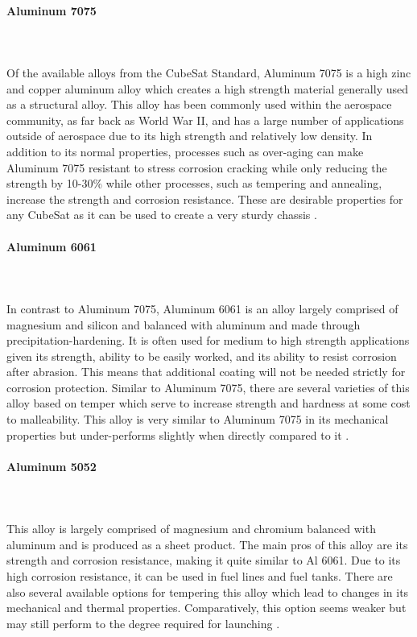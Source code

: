 \paragraph{Aluminum 7075} ~\\~\\
Of the available alloys from the CubeSat Standard, Aluminum 7075 is a high zinc and copper aluminum alloy which creates a high strength material generally used as a structural alloy. This alloy has been commonly used within the aerospace community, as far back as World War II, and has a large number of applications outside of aerospace due to its high strength and relatively low density. In addition to its normal properties, processes such as over-aging can make Aluminum 7075 resistant to stress corrosion cracking while only reducing the strength by 10-30\% while other processes, such as tempering and annealing, increase the strength and corrosion resistance. These are desirable properties for any CubeSat as it can be used to create a very sturdy chassis \cite{ASM}. 
\paragraph{Aluminum 6061} ~\\~\\
In contrast to Aluminum 7075, Aluminum 6061 is an alloy largely comprised of magnesium and silicon and balanced with aluminum and made through precipitation-hardening. It is often used for medium to high strength applications given its strength, ability to be easily worked, and its ability to resist corrosion after abrasion. This means that additional coating will not be needed strictly for corrosion protection. Similar to Aluminum 7075, there are several varieties of this alloy based on temper which serve to increase strength and hardness at some cost to malleability. This alloy is very similar to Aluminum 7075 in its mechanical properties but under-performs slightly when directly compared to it \cite{ASM}.
\paragraph{Aluminum 5052} ~\\~\\
This alloy is largely comprised of magnesium and chromium balanced with aluminum and is produced as a sheet product. The main pros of this alloy are its strength and corrosion resistance, making it quite similar to Al 6061. Due to its high corrosion resistance, it can be used in fuel lines and fuel tanks. There are also several available options for tempering this alloy which lead to changes in its mechanical and thermal properties. Comparatively, this option seems weaker but may still perform to the degree required for launching \cite{ASM}.
